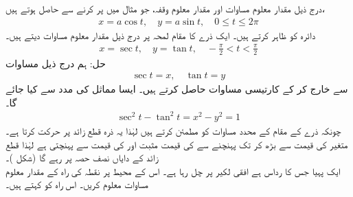 درج ذیل مقدار معلوم مساوات اور مقدار معلوم وقفہ، جو مثال  میں  پر کرنے سے حاصل ہوتے ہیں،
\begin{align*}
x=a\cos t,\quad y=a\sin t,\quad 0\le t\le 2\pi
\end{align*}
دائرہ  کو ظاہر کرتے ہیں۔
ایک ذرے کا مقام لمحہ  پر درج ذیل مقدار معلوم مساوات دیتے ہیں۔
\begin{align*}
x=\sec t,\quad y=\tan t,\quad -\frac{\pi}{2}<t<\frac{\pi}{2}
\end{align*}
حل:\quad
ہم درج ذیل مساوات
\begin{align*}
\sec t=x,\quad \tan t=y
\end{align*}
 سے  خارج کر کے کارتیسی مساوات حاصل کرتے ہیں۔ ایسا مماثل  کی مدد سے کیا جائے گا۔
\begin{align*}
\sec^2t-\tan^2t=x^2-y^2=1
\end{align*}
چونکہ ذرے کے مقام کے محدد  مساوات  کو مطمئن کرتے ہیں لہٰذا یہ ذرہ قطع زائد پر حرکت کرتا ہے۔ متغیر  کی قیمت  سے بڑھ کر  تک پہنچنے سے  کی قیمت مثبت اور  کی قیمت  سے  پہنچتی ہے لہٰذا  قطع زائد کے دایاں نصف حصہ پر رہے گا (شکل )۔  
\\
ایک پہیا جس کا رداس  ہے افقی لکیر پر چل رہا ہے۔ اس کے محیط پر نقطہ  کی راہ کے مقدار معلوم مساوات معلوم کریں۔ اس راہ کو  کہتے ہیں۔

